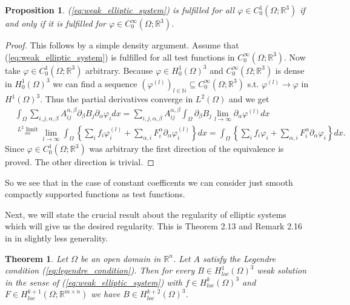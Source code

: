 \documentclass[12pt,a4paper]{article}
\numberwithin{equation}{subsection}
\numberwithin{lemma}{subsection}
\newtheorem{proposition}[lemma]{Proposition}
\newtheorem{theorem}[lemma]{Theorem}
\theoremstyle{definition}
\newcommand{\naturalnum}{\mathbb{N}}
\newcommand{\real}{\mathbb{R}}
\begin{document}
\begin{proposition}\label{prop:weak_solution_smooth_test_functions}
    (\ref{eq:weak_elliptic_system}) is fulfilled for all 
    $\varphi \in C^1_0(\Omega;\real^3)$ if and only if it is fulfilled 
    for $\varphi \in C^\infty_0(\Omega;\real^3)$.
\end{proposition}
\begin{proof}
    This follows by a simple density argument. Assume that 
    (\ref{eq:weak_elliptic_system}) is fulfilled for all test functions in 
    $C^\infty_0(\Omega;\real^3)$. Now take $\varphi \in C^1_0(\Omega;\real^3)$
    arbitrary. Because $\varphi \in H_0^1(\Omega)^3$ and 
    $C^\infty_0(\Omega;\real^3)$ is dense in $H_0^1(\Omega)^3$ we can find 
    a sequence $(\varphi^{(l)})_{l \in \naturalnum} \subseteq 
    C^\infty_0(\Omega;\real^3)$ s.t. $\varphi^{(l)} \rightarrow \varphi$
    in $H^1(\Omega)^3$. Thus the partial derivatives converge in $L^2(\Omega)$
    and we get
    \begin{align*}
        &\int_\Omega \sum\limits_{i,j,\alpha,\beta} 
            A_{ij}^{\alpha, \beta} \partial_\beta B_j \partial_\alpha \varphi_i
            dx
        = \sum\limits_{i,j,\alpha,\beta} A_{ij}^{\alpha, \beta}
            \int_\Omega \partial_\beta B_j \lim\limits_{l\rightarrow \infty} 
            \partial_\alpha \varphi^{(l)} dx
        \\ &\stackrel{\text{$L^2$ limit}}{=} 
            \lim\limits_{l\rightarrow \infty} 
            \int_\Omega \left\{ \sum\limits_i f_i \varphi^{(l)}_i + 
            \sum\limits_{\alpha,i} F_i^\alpha \partial_\alpha \varphi^{(l)}_i 
            \right\} dx
        = \int_\Omega \left\{ \sum\limits_i f_i \varphi_i + 
            \sum\limits_{\alpha,i} F_i^\alpha \partial_\alpha \varphi_i 
            \right\} dx.
    \end{align*}
    Since $\varphi \in C_0^1(\Omega;\real^3)$ was arbitrary the first 
    direction of the equivalence is proved. The other direction is trivial.
\end{proof}
So we see that in the case of constant coefficents we can consider 
just smooth compactly supported functions as test functions.

Next, we will state the crucial result about the regularity of elliptic systems
which will give us the desired regularity. This is Theorem 2.13 and Remark 2.16 
in \cite{lectures_on_elliptic_pdes} in slightly less generality.
\begin{theorem}\label{thm:regularity_elliptic_systems}
    Let $\Omega$ be an open domain in $\real^n$. Let $A$ 
    satisfy the Legendre condition (\ref{eq:legendre_condition}). Then for every 
    $B \in H^1_{loc}(\Omega)^3$ weak solution in the sense of
    (\ref{eq:weak_elliptic_system}) with $f \in H^k_{loc}(\Omega)^3$ and 
    $F \in H^{k+1}_{loc}(\Omega;\real^{m\times n})$ 
    we have $B \in H^{k+2}_{loc}(\Omega)^3$. 
\end{theorem}
\end{document}
